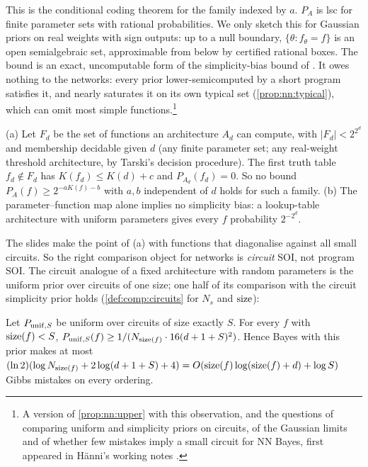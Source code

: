 This is the conditional coding theorem for the family indexed by $a$. $P_A$ is lsc for finite parameter sets with rational probabilities. We only sketch this for Gaussian priors on real weights with sign outputs: up to a null boundary, $\{\theta:f_\theta=f\}$ is an open semialgebraic set, approximable from below by certified rational boxes. The bound is an exact, uncomputable form of the simplicity-bias bound of \citet{dingle2018input}. It owes nothing to the networks: every prior lower-semicomputed by a short program satisfies it, and nearly saturates it on its own typical set (\cref{prop:nn:typical}), which can omit most simple functions.\footnote{A version of \cref{prop:nn:upper} with this observation, and the questions of comparing uniform and simplicity priors on circuits, of the Gaussian limits and of whether few mistakes imply a small circuit for NN Bayes, first appeared in H\"anni's working notes \citep{hanni2026notes}.}

\begin{proposition}\label{prop:nn:nolower}
(a) Let $F_d$ be the set of functions an architecture $A_d$ can compute, with $|F_d|<2^{2^d}$ and membership decidable given $d$ (any finite parameter set; any real-weight threshold architecture, by Tarski's decision procedure). The first truth table $f_d\notin F_d$ has $K(f_d)\le K(d)+c$ and $P_{A_d}(f_d)=0$. So no bound $P_A(f)\ge2^{-aK(f)-b}$ with $a,b$ independent of $d$ holds for such a family. (b) The parameter--function map alone implies no simplicity bias: a lookup-table architecture with uniform parameters gives every $f$ probability $2^{-2^d}$.
\end{proposition}

The slides make the point of (a) with functions that diagonalise against all small circuits. So the right comparison object for networks is \emph{circuit} SOI, not program SOI. The circuit analogue of a fixed architecture with random parameters is the uniform prior over circuits of one size; one half of its comparison with the circuit simplicity prior holds (\cref{def:comp:circuits} for $N_s$ and $\operatorname{size}$):

\begin{proposition}\label{prop:nn:uniform}
Let $P_{{\rm unif},S}$ be uniform over circuits of size exactly $S$. For every $f$ with $\operatorname{size}(f)<S$, $P_{{\rm unif},S}(f)\ge1/(N_{\operatorname{size}(f)}\cdot16(d+1+S)^2)$. Hence Bayes with this prior makes at most $(\ln2)(\log N_{\operatorname{size}(f)}+2\log(d+1+S)+4)=O(\operatorname{size}(f)\log(\operatorname{size}(f)+d)+\log S)$ Gibbs mistakes on every ordering.
\end{proposition}

